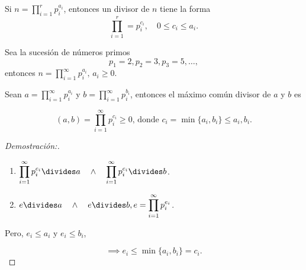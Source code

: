 \documentclass[oneside,a5paper]{memoir}
\begin{document}
\begin{theorem}

Si $\displaystyle n=\prod_{i=1}^{r}{p}^{a_i}_{i}$, entonces un divisor de $n$ tiene la forma
\[\prod_{i=1}^{r}={p}^{c_i}_{i},\quad0\leq c_i\leq a_i.\]

\end{theorem}

\begin{remark}

Sea la sucesión de números primos
\[p_1=2, p_2=3, p_3=5, \ldots,\]
entonces $\displaystyle n=\prod_{i=1}^{\infty}{p}^{a_i}_{i},\, a_i\geq0$.

\end{remark}

\begin{theorem}

Sean $\displaystyle a=\prod_{i=1}^{\infty}{p}^{a_i}_{i}$ y $\displaystyle b=\prod_{i=1}^{\infty}{p}^{b_i}_{i}$, entonces el máximo común divisor de $a$ y $b$ es

\[(a,b)=\displaystyle\prod_{i=1}^{\infty}{p}^{c_i}_{i}\geq0\text{, donde }c_i=\min\{a_i,b_i\}\leq a_i,b_i.\]

\begin{proof}[Demostración:]

\begin{enumerate}[font={\bfseries},label={*)}]

\item $\displaystyle\prod_{i=1}^{\infty}{p}^{c_i}_{i}\divides a\quad\wedge\quad\prod_{i=1}^{\infty}{p}^{c_i}_{i}\divides b$.

\item $e\divides a\quad\wedge\quad e\divides b, e=\displaystyle\prod_{i=1}^{\infty}{p}^{e_i}_{i}$.

\end{enumerate}

\noindent
Pero, $e_i\leq a_i$ y $e_i\leq b_i$,

\[\implies e_i\leq\min\{a_i,b_i\}=c_i.\]

\end{proof}

\end{theorem}
\end{document}
